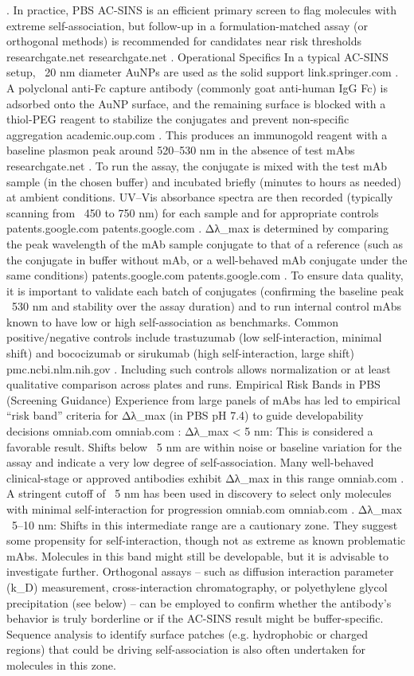 . In practice, PBS AC-SINS is an efficient primary screen to flag molecules with extreme self-association, but follow-up in a formulation-matched assay (or orthogonal methods) is recommended for candidates near risk thresholds
researchgate.net
researchgate.net
.
Operational Specifics
In a typical AC-SINS setup, ~20 nm diameter AuNPs are used as the solid support
link.springer.com
. A polyclonal anti-Fc capture antibody (commonly goat anti-human IgG Fc) is adsorbed onto the AuNP surface, and the remaining surface is blocked with a thiol-PEG reagent to stabilize the conjugates and prevent non-specific aggregation
academic.oup.com
. This produces an immunogold reagent with a baseline plasmon peak around 520–530 nm in the absence of test mAbs
researchgate.net
. To run the assay, the conjugate is mixed with the test mAb sample (in the chosen buffer) and incubated briefly (minutes to hours as needed) at ambient conditions. UV–Vis absorbance spectra are then recorded (typically scanning from ~450 to 750 nm) for each sample and for appropriate controls
patents.google.com
patents.google.com
. Δλ_max is determined by comparing the peak wavelength of the mAb sample conjugate to that of a reference (such as the conjugate in buffer without mAb, or a well-behaved mAb conjugate under the same conditions)
patents.google.com
patents.google.com
. To ensure data quality, it is important to validate each batch of conjugates (confirming the baseline peak ~530 nm and stability over the assay duration) and to run internal control mAbs known to have low or high self-association as benchmarks. Common positive/negative controls include trastuzumab (low self-interaction, minimal shift) and bococizumab or sirukumab (high self-interaction, large shift)
pmc.ncbi.nlm.nih.gov
. Including such controls allows normalization or at least qualitative comparison across plates and runs.
Empirical Risk Bands in PBS (Screening Guidance)
Experience from large panels of mAbs has led to empirical “risk band” criteria for Δλ_max (in PBS pH 7.4) to guide developability decisions
omniab.com
omniab.com
:
Δλ_max < 5 nm: This is considered a favorable result. Shifts below ~5 nm are within noise or baseline variation for the assay and indicate a very low degree of self-association. Many well-behaved clinical-stage or approved antibodies exhibit Δλ_max in this range
omniab.com
. A stringent cutoff of ~5 nm has been used in discovery to select only molecules with minimal self-interaction for progression
omniab.com
omniab.com
.
Δλ_max ~5–10 nm: Shifts in this intermediate range are a cautionary zone. They suggest some propensity for self-interaction, though not as extreme as known problematic mAbs. Molecules in this band might still be developable, but it is advisable to investigate further. Orthogonal assays – such as diffusion interaction parameter (k_D) measurement, cross-interaction chromatography, or polyethylene glycol precipitation (see below) – can be employed to confirm whether the antibody’s behavior is truly borderline or if the AC-SINS result might be buffer-specific. Sequence analysis to identify surface patches (e.g. hydrophobic or charged regions) that could be driving self-association is also often undertaken for molecules in this zone.
